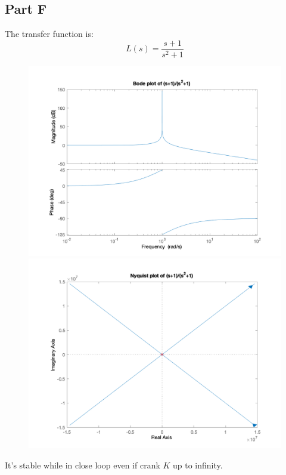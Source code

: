 \documentclass[a4paper]{article}
\begin{document}
\subsection{Part F} 
The transfer function is:
$$
L(s) = \frac{s+1}{s^2+1}
$$
\begin{figure}[H]
\centering
\begin{minipage}[t]{0.48\textwidth}
\centering
\includegraphics[width=\textwidth]{pic/13.png}
\end{minipage}
\begin{minipage}[t]{0.48\textwidth}
\centering
\includegraphics[width=\textwidth]{pic/14.png}
\end{minipage}
\end{figure}
It's stable while in close loop even if crank $K$ up to infinity.
\end{document}
